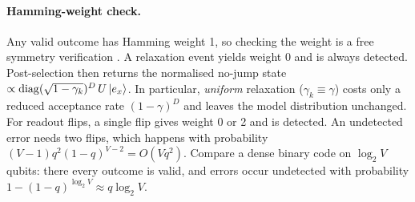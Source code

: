 \paragraph{Hamming-weight check.} Any valid outcome has Hamming weight 1, so checking the weight is a free
symmetry verification \citep{bonet2018low,mcardle2019error}. A relaxation event yields weight 0 and is
always detected. Post-selection then returns the normalised no-jump state
$\propto\mathrm{diag}(\sqrt{1-\gamma_k})^{D}\,U\ket{e_x}$. In particular, \emph{uniform} relaxation
($\gamma_k\equiv\gamma$) costs only a reduced acceptance rate $(1-\gamma)^D$ and leaves the
model distribution unchanged. For readout flips, a single flip gives weight 0 or 2 and is detected. An
undetected error needs two flips, which happens with probability
$(V\!-\!1)q^2(1-q)^{V-2}=O(Vq^2)$. Compare a dense binary code on $\log_2V$ qubits: there every outcome
is valid, and errors occur undetected with probability $1-(1-q)^{\log_2V}\approx q\log_2V$.
